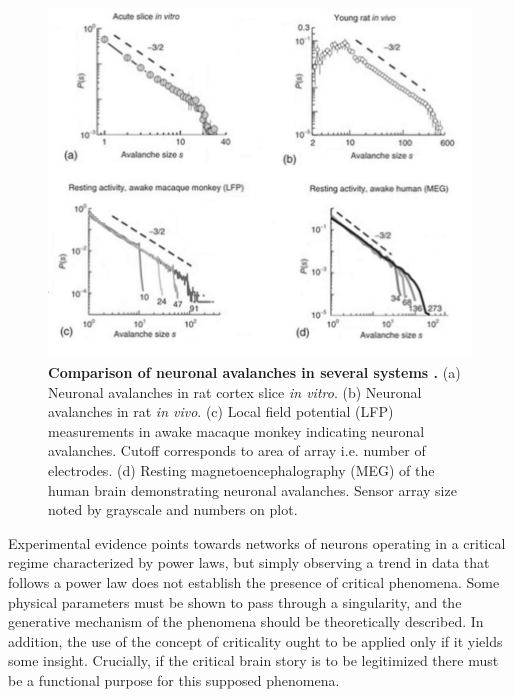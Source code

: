 \documentclass[12pt]{article}
\begin{document}
\begin{figure}      
  \begin{center}    
 \includegraphics[width=1\textwidth]{avalanchesplenzbook3}    
    \caption{\textbf{Comparison of neuronal avalanches in several systems \cite{Plenz2014}.} (a) Neuronal avalanches in rat cortex slice \textit{in vitro}. (b) Neuronal avalanches in rat \textit{in vivo}. (c) Local field potential (LFP) measurements in awake macaque monkey indicating neuronal avalanches. Cutoff corresponds to area of array i.e. number of electrodes. (d) Resting magnetoencephalography (MEG) of the human brain demonstrating neuronal avalanches. Sensor array size noted by grayscale and numbers on plot.}
   \label{Figure::Neuronal avalanches in vitro and in vivo}   
  \end{center}     
   \end{figure}

Experimental evidence points towards networks of neurons operating in a critical regime characterized by power laws, but simply observing a trend in data that follows a power law does not establish the presence of critical phenomena. Some physical parameters must be shown to pass through a singularity, and the generative mechanism of the phenomena should be theoretically described. In addition, the use of the concept of criticality ought to be applied only if it yields some insight. Crucially, if the critical brain story is to be legitimized there must be a functional purpose for this supposed phenomena. 
      
\end{document}

